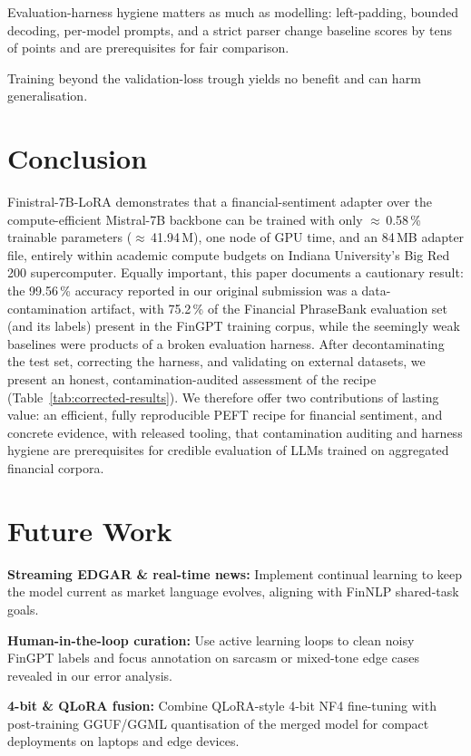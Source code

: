 \documentclass[a4paper]{article}
\begin{document}
Evaluation-harness hygiene matters as much as modelling: left-padding, bounded decoding, per-model prompts, and a strict parser change baseline scores by tens of points and are prerequisites for fair comparison.

Training beyond the validation-loss trough yields no benefit and can harm generalisation.


\section{Conclusion}

Finistral-7B-LoRA demonstrates that a financial-sentiment adapter over the compute-efficient Mistral-7B backbone can be trained with only $\approx$\,0.58\,\% trainable parameters ($\approx$\,41.94\,M), one node of GPU time, and an 84\,MB adapter file, entirely within academic compute budgets on Indiana University's Big Red 200 supercomputer. Equally important, this paper documents a cautionary result: the 99.56\,\% accuracy reported in our original submission was a data-contamination artifact, with 75.2\,\% of the Financial PhraseBank evaluation set (and its labels) present in the FinGPT training corpus, while the seemingly weak baselines were products of a broken evaluation harness. After decontaminating the test set, correcting the harness, and validating on external datasets, we present an honest, contamination-audited assessment of the recipe (Table~\ref{tab:corrected-results}). We therefore offer two contributions of lasting value: an efficient, fully reproducible PEFT recipe for financial sentiment, and concrete evidence, with released tooling, that contamination auditing and harness hygiene are prerequisites for credible evaluation of LLMs trained on aggregated financial corpora.


\section{Future Work}

\textbf{Streaming EDGAR \& real-time news:} Implement continual learning to keep the model current as market language evolves, aligning with FinNLP shared-task goals.

\textbf{Human-in-the-loop curation:} Use active learning loops to clean noisy FinGPT labels and focus annotation on sarcasm or mixed-tone edge cases revealed in our error analysis.

\textbf{4-bit \& QLoRA fusion:} Combine QLoRA-style 4-bit NF4 fine-tuning \cite{dettmers2023} with post-training GGUF/GGML quantisation of the merged model for compact deployments on laptops and edge devices.
\end{document}
